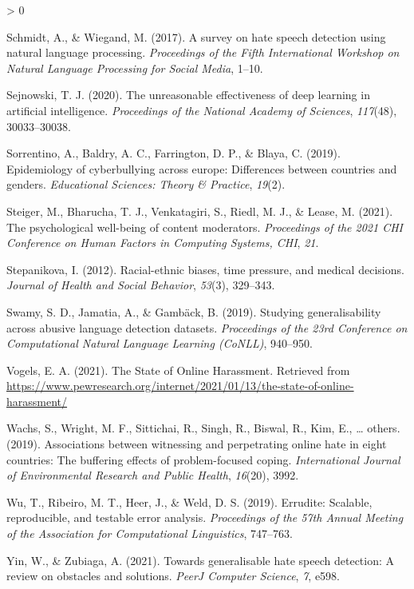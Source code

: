 \documentclass[
  10pt,
  dvipsnames,enabledeprecatedfontcommands]{scrartcl}
\newlength{\cslhangindent}
\newenvironment{CSLReferences}[2] %
 {%
  \setlength{\parindent}{0pt}
  \ifodd #1 \everypar{\setlength{\hangindent}{\cslhangindent}}\ignorespaces\fi
  \ifnum #2 > 0
  \setlength{\parskip}{#2\baselineskip}
  \fi
 }%
 {}
\begin{document}
\begin{CSLReferences}{1}{0}
\leavevmode\hypertarget{ref-schmidt2017survey}{}%
Schmidt, A., \& Wiegand, M. (2017). A survey on hate speech detection
using natural language processing. \emph{Proceedings of the Fifth
International Workshop on Natural Language Processing for Social Media},
1--10.

\leavevmode\hypertarget{ref-sejnowski2020unreasonable}{}%
Sejnowski, T. J. (2020). The unreasonable effectiveness of deep learning
in artificial intelligence. \emph{Proceedings of the National Academy of
Sciences}, \emph{117}(48), 30033--30038.

\leavevmode\hypertarget{ref-sorrentino2019epidemiology}{}%
Sorrentino, A., Baldry, A. C., Farrington, D. P., \& Blaya, C. (2019).
Epidemiology of cyberbullying across europe: Differences between
countries and genders. \emph{Educational Sciences: Theory \& Practice},
\emph{19}(2).

\leavevmode\hypertarget{ref-steiger2021psychological}{}%
Steiger, M., Bharucha, T. J., Venkatagiri, S., Riedl, M. J., \& Lease,
M. (2021). The psychological well-being of content moderators.
\emph{Proceedings of the 2021 CHI Conference on Human Factors in
Computing Systems, CHI}, \emph{21}.

\leavevmode\hypertarget{ref-stepanikova2012racial}{}%
Stepanikova, I. (2012). Racial-ethnic biases, time pressure, and medical
decisions. \emph{Journal of Health and Social Behavior}, \emph{53}(3),
329--343.

\leavevmode\hypertarget{ref-swamy2019studying}{}%
Swamy, S. D., Jamatia, A., \& Gambäck, B. (2019). Studying
generalisability across abusive language detection datasets.
\emph{Proceedings of the 23rd Conference on Computational Natural
Language Learning (CoNLL)}, 940--950.

\leavevmode\hypertarget{ref-vogels_state_2021}{}%
Vogels, E. A. (2021). The {State} of {Online} {Harassment}. Retrieved
from
\url{https://www.pewresearch.org/internet/2021/01/13/the-state-of-online-harassment/}

\leavevmode\hypertarget{ref-wachs2019associations}{}%
Wachs, S., Wright, M. F., Sittichai, R., Singh, R., Biswal, R., Kim, E.,
\ldots{} others. (2019). Associations between witnessing and
perpetrating online hate in eight countries: The buffering effects of
problem-focused coping. \emph{International Journal of Environmental
Research and Public Health}, \emph{16}(20), 3992.

\leavevmode\hypertarget{ref-wu2019errudite}{}%
Wu, T., Ribeiro, M. T., Heer, J., \& Weld, D. S. (2019). Errudite:
Scalable, reproducible, and testable error analysis. \emph{Proceedings
of the 57th Annual Meeting of the Association for Computational
Linguistics}, 747--763.

\leavevmode\hypertarget{ref-yin2021towards}{}%
Yin, W., \& Zubiaga, A. (2021). Towards generalisable hate speech
detection: A review on obstacles and solutions. \emph{PeerJ Computer
Science}, \emph{7}, e598.

\end{CSLReferences}
\end{document}
